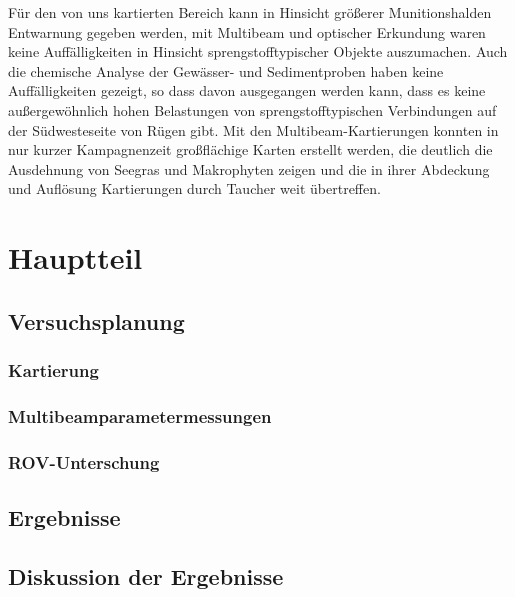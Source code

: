 \documentclass[12pt,titlepage]{scrreprt}
\begin{document}
Für den von uns kartierten Bereich kann in Hinsicht größerer Munitionshalden Entwarnung gegeben werden, mit Multibeam und optischer Erkundung waren keine Auffälligkeiten in Hinsicht sprengstofftypischer Objekte auszumachen. Auch die chemische Analyse der Gewässer- und Sedimentproben haben keine Auffälligkeiten gezeigt, so dass davon ausgegangen werden kann, dass es keine außergewöhnlich hohen Belastungen von sprengstofftypischen Verbindungen auf der Südwesteseite von Rügen gibt. Mit den Multibeam-Kartierungen konnten in nur kurzer Kampagnenzeit  großflächige Karten erstellt werden, die deutlich die Ausdehnung von Seegras und Makrophyten zeigen und die in ihrer Abdeckung und Auflösung Kartierungen durch Taucher weit übertreffen.

\tableofcontents

\chapter{Hauptteil}
\section{Versuchsplanung}
\subsection{Kartierung}

%
\subsection{Multibeamparametermessungen}

\subsection{ROV-Unterschung}

\section{Ergebnisse}
\section{Diskussion der Ergebnisse}






\end{document}
